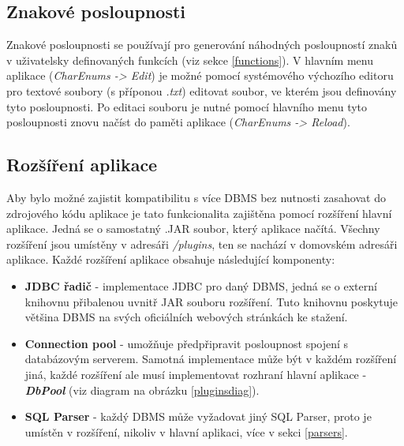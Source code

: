 \documentclass[czech,bachelor,public,dept460,male,cpdeclaration,twoside]{diploma}
\begin{document}
\subsection{Znakové posloupnosti} \label{charenums}
Znakové posloupnosti se používají pro generování náhodných posloupností znaků v uživatelsky definovaných funkcích (viz sekce \ref{functions}). V hlavním menu aplikace (\textit{CharEnums -> Edit}) je možné pomocí systémového výchozího editoru pro textové soubory (s příponou \textit{.txt}) editovat soubor, ve kterém jsou definovány tyto posloupnosti. Po editaci souboru je nutné pomocí hlavního menu tyto posloupnosti znovu načíst do paměti aplikace (\textit{CharEnums -> Reload}).

\subsection{Rozšíření aplikace} \label{plugins}
Aby bylo možné zajistit kompatibilitu s více DBMS bez nutnosti zasahovat do zdrojového kódu aplikace je tato funkcionalita zajištěna pomocí rozšíření hlavní aplikace. Jedná se o samostatný .JAR soubor, který aplikace načítá. Všechny rozšíření jsou umístěny v adresáři \textit{/plugins}, ten se nachází v domovském adresáři aplikace. Každé rozšíření aplikace obsahuje následující komponenty:
\begin{itemize}
\item \textbf{JDBC řadič} - implementace JDBC pro daný DBMS, jedná se o externí knihovnu přibalenou uvnitř JAR souboru rozšíření. Tuto knihovnu poskytuje většina DBMS na svých oficiálních webových stránkách ke stažení.
\item \textbf{Connection pool} - umožňuje předpřipravit posloupnost spojení s databázovým serverem. Samotná implementace může být v každém rozšíření jiná, každé rozšíření ale musí implementovat rozhraní hlavní aplikace - \textbf{\emph{DbPool}} (viz diagram na obrázku \ref{pluginsdiag}).
\item \textbf{SQL Parser} - každý DBMS může vyžadovat jiný SQL Parser, proto je umístěn v rozšíření, nikoliv v hlavní aplikaci, více v sekci \ref{parsers}. 
\end{itemize}
\end{document}
